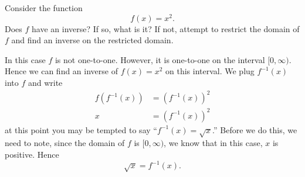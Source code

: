 \documentclass{ximera}
\begin{document}
\begin{example}
Consider the function
\[
f(x) = x^2.
\]
Does $f$ have an inverse? If so, what is it? If not, attempt to
restrict the domain of $f$ and find an inverse on the restricted
domain.
\begin{explanation}
In this case $f$ is not one-to-one. However, it is one-to-one on the
interval $[0,\infty)$. Hence we can find an inverse of $f(x)=x^2$ on
  this interval. We plug $f^{-1}(x)$ into $f$ and write
  \begin{align*}
    f(f^{-1}(x)) &= \left(f^{-1}(x)\right)^2\\
    x &= \left(f^{-1}(x)\right)^2
  \end{align*}
  at this point you may be tempted to say ``$f^{-1}(x) = \sqrt{x}$.''
  Before we do this, we need to note, since the domain of $f$ is
  $[0,\infty)$, we know that in this case, $x$ is positive. Hence
    \[
    \sqrt{x} = f^{-1}(x).
    \]
    \begin{image}
\end{image}
\end{explanation}
\end{example}
\end{document}
